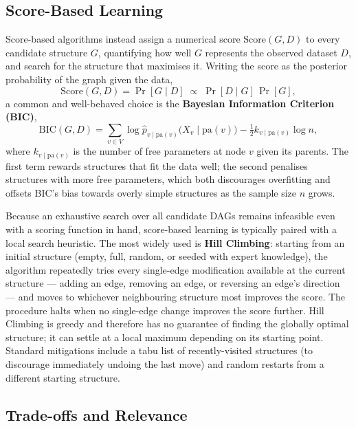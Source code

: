 \subsection{Score-Based Learning}

Score-based algorithms instead assign a numerical score
$\mathrm{Score}(G, D)$ to every candidate structure $G$, quantifying how well
$G$ represents the observed dataset $D$, and search for the structure that
maximises it. Writing the score as the posterior probability of the graph
given the data,
\[
  \mathrm{Score}(G, D) = \Pr[G \mid D] \;\propto\; \Pr[D \mid G]\,\Pr[G],
\]
a common and well-behaved choice is the \textbf{Bayesian Information
Criterion (BIC)},
\[
  \mathrm{BIC}(G, D) = \sum_{v \in V} \log \hat p_{v \mid \mathrm{pa}(v)}
    \bigl(X_v \mid \mathrm{pa}(v)\bigr) - \tfrac{1}{2} k_{v \mid \mathrm{pa}(v)}
    \log n,
\]
where $k_{v\mid\mathrm{pa}(v)}$ is the number of free parameters at node $v$
given its parents. The first term rewards structures that fit the data well;
the second penalises structures with more free parameters, which both
discourages overfitting and offsets BIC's bias towards overly simple
structures as the sample size $n$ grows.

Because an exhaustive search over all candidate DAGs remains infeasible even
with a scoring function in hand, score-based learning is typically paired
with a local search heuristic. The most widely used is \textbf{Hill
Climbing}: starting from an initial structure (empty, full, random, or
seeded with expert knowledge), the algorithm repeatedly tries every
single-edge modification available at the current structure — adding an
edge, removing an edge, or reversing an edge's direction — and moves to
whichever neighbouring structure most improves the score. The procedure
halts when no single-edge change improves the score further. Hill Climbing
is greedy and therefore has no guarantee of finding the globally optimal
structure; it can settle at a local maximum depending on its starting point.
Standard mitigations include a tabu list of recently-visited
structures (to discourage immediately undoing the last move) and random restarts from a different starting structure.

\subsection{Trade-offs and Relevance}

